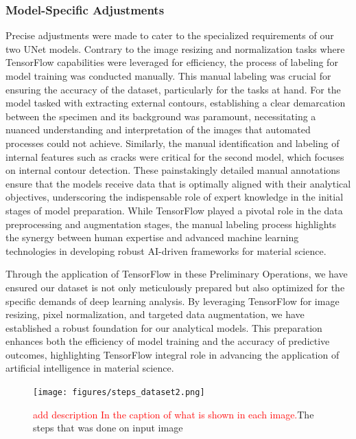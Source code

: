 \documentclass[preprint,12pt]{elsarticle}
\begin{document}
\subsubsection{Model-Specific Adjustments}
Precise adjustments were made to cater to the specialized requirements of our two UNet models. Contrary to the image resizing and normalization tasks where TensorFlow capabilities were leveraged for efficiency, the process of labeling for model training was conducted manually. This manual labeling was crucial for ensuring the accuracy of the dataset, particularly for the tasks at hand. For the model tasked with extracting external contours, establishing a clear demarcation between the specimen and its background was paramount, necessitating a nuanced understanding and interpretation of the images that automated processes could not achieve. Similarly, the manual identification and labeling of internal features such as cracks were critical for the second model, which focuses on internal contour detection. These painstakingly detailed manual annotations ensure that the models receive data that is optimally aligned with their analytical objectives, underscoring the indispensable role of expert knowledge in the initial stages of model preparation. While TensorFlow played a pivotal role in the data preprocessing and augmentation stages, the manual labeling process highlights the synergy between human expertise and advanced machine learning technologies in developing robust AI-driven frameworks for material science.

Through the application of TensorFlow in these Preliminary Operations, we have ensured our dataset is not only meticulously prepared but also optimized for the specific demands of deep learning analysis. By leveraging TensorFlow for image resizing, pixel normalization, and targeted data augmentation, we have established a robust foundation for our analytical models. This preparation enhances both the efficiency of model training and the accuracy of predictive outcomes, highlighting TensorFlow integral role in advancing the application of artificial intelligence in material science.





\begin{figure}[t!]
  \centering

  \begin{minipage}{1\textwidth}
    \centering
    \texttt{[image: figures/steps\_dataset2.png]}
    \caption{\textcolor{red}{add description In the caption of what is shown in each image.}The steps that was done on input image}
    \label{steps}
  \end{minipage}

\end{figure}
\end{document}
